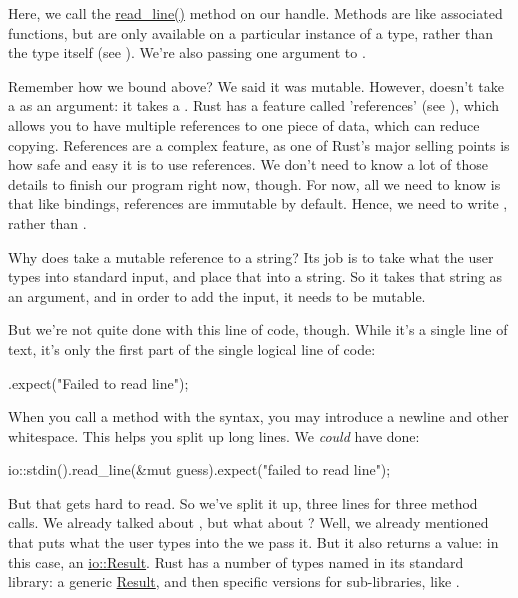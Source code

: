 Here, we call the \href{https://doc.rust-lang.org/std/io/struct.Stdin.html\#method.read\_line}{read\_line()} method on our handle.
Methods are like associated functions, but are only available on a particular instance of a type, rather than the type itself 
(see ). We're also passing one argument to .

\blank

Remember how we bound  above? We said it was mutable. However,  doesn't take a  as 
an argument: it takes a . Rust has a feature called 'references' (see ), 
which allows you to have multiple references to one piece of data, which can reduce copying. References are a complex feature, as 
one of Rust's major selling points is how safe and easy it is to use references. We don't need to know a lot of those details to 
finish our program right now, though. For now, all we need to know is that like  bindings, references are immutable by 
default. Hence, we need to write , rather than .

\blank

Why does  take a mutable reference to a string? Its job is to take what the user types into standard input, 
and place that into a string. So it takes that string as an argument, and in order to add the input, it needs to be mutable.

\blank

But we're not quite done with this line of code, though. While it's a single line of text, it's only the first part of the 
single logical line of code:

\begin{rustc}
        .expect("Failed to read line");
\end{rustc}

When you call a method with the  syntax, you may introduce a newline and other whitespace. This helps you 
split up long lines. We \emph{could} have done:

\begin{rustc}
    io::stdin().read_line(&mut guess).expect("failed to read line");
\end{rustc}

But that gets hard to read. So we've split it up, three lines for three method calls. We already talked about ,
but what about ? Well, we already mentioned that  puts what the user types into the 
 we pass it. But it also returns a value: in this case, an 
\href{https://doc.rust-lang.org/std/io/type.Result.html}{io::Result}. Rust has a number of types named  in its 
standard library: a generic \href{https://doc.rust-lang.org/std/result/enum.Result.html}{Result}, and then specific versions 
for sub-libraries, like .

